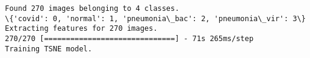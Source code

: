 \documentclass[11pt]{article}
\begin{document}
    \begin{Verbatim}[commandchars=\\\{\}]
Found 270 images belonging to 4 classes.
\{'covid': 0, 'normal': 1, 'pneumonia\_bac': 2, 'pneumonia\_vir': 3\}
Extracting features for 270 images.
270/270 [==============================] - 71s 265ms/step
Training TSNE model.
    \end{Verbatim}

    \begin{center}
    \end{center}
    { \hspace*{\fill} \\}
    
    

    

    


    
    
    
\end{document}
